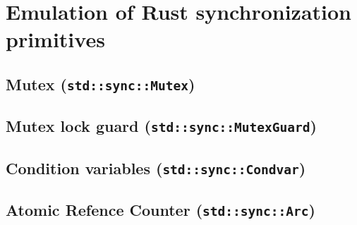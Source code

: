 \section{Emulation of Rust synchronization primitives}
\label{sec:sync-primitives}

\subsection{Mutex (\texttt{std::sync::Mutex})}
\subsection{Mutex lock guard (\texttt{std::sync::MutexGuard})}
\subsection{Condition variables (\texttt{std::sync::Condvar})}
\subsection{Atomic Refence Counter (\texttt{std::sync::Arc})}